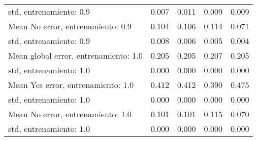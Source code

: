 \begin{longtable}{p{4cm}|p{1.5cm}|p{1.5cm}|p{1.5cm}|p{1.5cm}}
std, entrenamiento: 0.9               & 0.007 &        0.011 &     0.009 &                        0.009 \\
Mean No error, entrenamiento: 0.9     & 0.104 &        0.106 &     0.114 &                        0.071 \\
std, entrenamiento: 0.9               & 0.008 &        0.006 &     0.005 &                        0.004 \\
Mean global error, entrenamiento: 1.0 & 0.205 &        0.205 &     0.207 &                        0.205 \\
std, entrenamiento: 1.0               & 0.000 &        0.000 &     0.000 &                        0.000 \\
Mean Yes error, entrenamiento: 1.0    & 0.412 &        0.412 &     0.390 &                        0.475 \\
std, entrenamiento: 1.0               & 0.000 &        0.000 &     0.000 &                        0.000 \\
Mean No error, entrenamiento: 1.0     & 0.101 &        0.101 &     0.115 &                        0.070 \\
std, entrenamiento: 1.0               & 0.000 &        0.000 &     0.000 &                        0.000 \\
\end{longtable}
